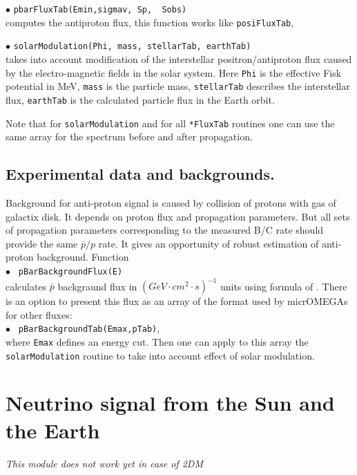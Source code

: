 \documentclass[12pt,a4paper]{article}
\begin{document}
\noindent
$\bullet$ \verb|pbarFluxTab(Emin,sigmav, Sp,  Sobs)|\\
computes the antiproton flux, this function works like \verb|posiFluxTab|,

\noindent
$\bullet$ \verb|solarModulation(Phi, mass, stellarTab, earthTab)|\\
takes into account modification of the interstellar positron/antiproton flux 
caused by the electro-magnetic fields in the solar system. Here \verb|Phi| is the
effective Fisk potential in MeV, \verb|mass| is the particle mass,
\verb|stellarTab| describes the interstellar flux, \verb|earthTab| 
is the calculated particle flux in the Earth orbit.

Note that for \verb|solarModulation| and for  all \verb|*FluxTab| 
routines one can use  the same array for the spectrum before and after propagation. 

\subsection{Experimental data and backgrounds.}
Background  for  anti-proton  signal  is caused by  collision of protons with gas of
galactix disk. It depends on proton flux and propagation parameters. 
But all sets of  propagation parameters corresponding  to the measured  
B/C rate should provide the same $\bar{p}/p$ rate. It gives an opportunity of
robust estimation of anti-proton background. Function\\
$\bullet$ \verb| pBarBackgroundFlux(E)|\\
calculates $\bar{p}$ backgraund flux in $(GeV\cdot cm^2 \cdot s)^{-1}$ units
using formula of \cite{Maurin:2006hy}. There is an option to present this flux as 
an array of the format used by  micrOMEGAs for other fluxes: \\
 $\bullet$ \verb| pBarBackgroundTab(Emax,pTab)|,\\
where {\tt Emax} defines  an energy  cut. 
Then one can apply to this array the {\tt solarModulation} routine to take into 
account effect of solar modulation.


\section{Neutrino signal from the Sun and the Earth }
\label{sec:neutrino}

\begin{center}
{\it This module
does not work yet in case of 2DM}
\end{center}
\end{document}
